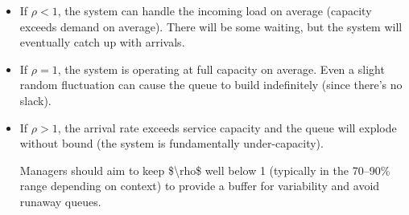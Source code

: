 \documentclass[
  letterpaper,
  DIV=11,
  numbers=noendperiod]{scrartcl}
\begin{document}
\begin{itemize}
\item
  If \(\rho < 1\), the system can handle the incoming load on average
  (capacity exceeds demand on average). There will be some waiting, but
  the system will eventually catch up with arrivals.
\item
  If \(\rho = 1\), the system is operating at full capacity on average.
  Even a slight random fluctuation can cause the queue to build
  indefinitely (since there's no slack).
\item
  If \(\rho > 1\), the arrival rate exceeds service capacity and the
  queue will explode without bound (the system is fundamentally
  under-capacity).

  Managers should aim to keep \$\textbackslash rho\$ well below 1
  (typically in the 70--90\% range depending on context) to provide a
  buffer for variability and avoid runaway queues.
\end{itemize}
\end{document}
